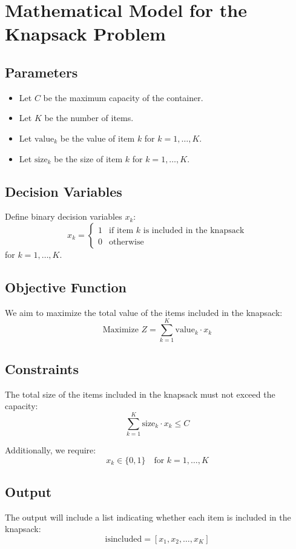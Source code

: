 \documentclass{article}
\begin{document}
\section*{Mathematical Model for the Knapsack Problem}

\subsection*{Parameters}
\begin{itemize}
    \item Let \( C \) be the maximum capacity of the container.
    \item Let \( K \) be the number of items.
    \item Let \( \text{value}_{k} \) be the value of item \( k \) for \( k = 1, \ldots, K \).
    \item Let \( \text{size}_{k} \) be the size of item \( k \) for \( k = 1, \ldots, K \).
\end{itemize}

\subsection*{Decision Variables}
Define binary decision variables \( x_k \):
\[
x_k = 
\begin{cases} 
1 & \text{if item } k \text{ is included in the knapsack} \\ 
0 & \text{otherwise} 
\end{cases}
\]
for \( k = 1, \ldots, K \).

\subsection*{Objective Function}
We aim to maximize the total value of the items included in the knapsack:
\[
\text{Maximize } Z = \sum_{k=1}^{K} \text{value}_{k} \cdot x_k
\]

\subsection*{Constraints}
The total size of the items included in the knapsack must not exceed the capacity:
\[
\sum_{k=1}^{K} \text{size}_{k} \cdot x_k \leq C
\]

Additionally, we require:
\[
x_k \in \{0, 1\} \quad \text{for } k = 1, \ldots, K
\]

\subsection*{Output}
The output will include a list indicating whether each item is included in the knapsack:
\[
\text{isincluded} = [x_1, x_2, \ldots, x_K]
\]
\end{document}
